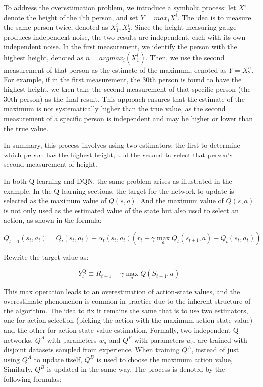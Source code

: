 \documentclass{article}
\begin{document}
To address the overestimation problem, we introduce a symbolic process: let $X^i$ denote the height of the i'th person, and set $ Y = max_{i}X^i$. The idea is to measure the same person twice, denoted as $X_1^i, X_2^i$. Since the height measuring gauge produces independent noise, the two results are independent, each with its own independent noise. In the first measurement, we identify the person with the highest height, denoted as $n = argmax_{i}(X_1^i)$. Then, we use the second measurement of that person as the estimate of the maximum, denoted as $Y = X^n_2$. For example, if in the first measurement, the 30th person is found to have the highest height, we then take the second measurement of that specific person (the 30th person) as the final result. This approach ensures that the estimate of the maximum is not systematically higher than the true value, as the second measurement of a specific person is independent and may be higher or lower than the true value.

In summary, this process involves using two estimators: the first to determine which person has the highest height, and the second to select that person's second measurement of height.

In both Q-learning and DQN, the same problem arises as illustrated in the example. In the Q-learning sections, the target for the network to update is selected as the maximum value of $Q(s,a)$. And the maximum value of $Q(s,a)$ is not only used as the estimated value of the state but also used to select an action, as shown in the formula:

\begin{equation}
Q_{t+1}\left(s_t, a_t\right)=Q_t\left(s_t, a_t\right)+\alpha_t\left(s_t, a_t\right)\left(r_t+\gamma \max _a Q_t\left(s_{t+1}, a\right)-Q_t\left(s_t, a_t\right)\right)
\end{equation}

Rewrite the target value as:

\begin{equation}
Y_t^{\mathrm{Q}} \equiv R_{t+1}+\gamma \max _a Q\left(S_{t+1}, a\right)
\end{equation}


This max operation leads to an overestimation of action-state values, and the overestimate phenomenon is common in practice due to the inherent structure of the algorithm. The idea to fix it remains the same that is to use two estimators, one for action selection (picking the action with the maximum action-state value) and the other for action-state value estimation. Formally, two independent Q-networks, $Q^A$ with parameters $w_a$ and $Q^B$ with parameters $w_b$, are trained with disjoint datasets sampled from experience. When training $Q^A$, instead of just using $Q^A$ to update itself, $Q^B$ is used to choose the maximum action value, Similarly, $Q^B$ is updated in the same way. The process is denoted by the following formulas:
\end{document}
